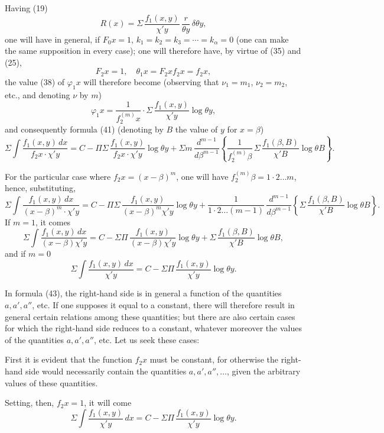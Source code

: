 \documentclass{article}
\begin{document}
Having (19)
\[ R(x) = \Sigma\,\frac{f_1(x, y)}{\chi' y}\,\frac{r}{\theta y}\,\delta\theta y, \]
one will have in general, if $F_0 x = 1$, $k_1 = k_2 = k_3 = \cdots = k_\alpha = 0$ (one can make the same supposition in every case); one will therefore have, by virtue of (35) and (25),
\[ F_2 x = 1, \quad \theta_1 x = F_2 x f_2 x = f_2 x, \]
the value (38) of $\varphi_1 x$ will therefore become (observing that $\nu_1 = m_1$, $\nu_2 = m_2$, etc., and denoting $\nu$ by $m$)
\[ \varphi_1 x = \frac{1}{f_2^{(m)} x} \cdot \Sigma\,\frac{f_1(x, y)}{\chi' y}\log\theta y, \]
and consequently formula (41) (denoting by $B$ the value of $y$ for $x = \beta$)
\[ \Sigma\int \frac{f_1(x, y)\,dx}{f_2 x \cdot \chi' y} = C - \Pi\Sigma\,\frac{f_1(x, y)}{f_2 x \cdot \chi' y}\log\theta y + \Sigma m\,\frac{d^{m-1}}{d\beta^{m-1}} \left\{ \frac{1}{f_2^{(m)}\beta}\,\Sigma\,\frac{f_1(\beta, B)}{\chi' B}\log\theta B \right\}. \tag{43} \]

For the particular case where $f_2 x = (x-\beta)^m$, one will have $f_2^{(m)}\beta = 1 \cdot 2 \ldots m$, hence, substituting,
\[ \Sigma\int \frac{f_1(x, y)\,dx}{(x-\beta)^m \cdot \chi' y} = C - \Pi\Sigma\,\frac{f_1(x, y)}{(x-\beta)^m \chi' y}\log\theta y + \frac{1}{1 \cdot 2 \ldots (m-1)}\,\frac{d^{m-1}}{d\beta^{m-1}} \left\{ \Sigma\,\frac{f_1(\beta, B)}{\chi' B}\log\theta B \right\}. \tag{44} \]
If $m = 1$, it comes
\[ \Sigma\int \frac{f_1(x, y)\,dx}{(x-\beta)\chi' y} = C - \Sigma\Pi\,\frac{f_1(x, y)}{(x-\beta)\chi' y}\log\theta y + \Sigma\,\frac{f_1(\beta, B)}{\chi' B}\log\theta B, \tag{45} \]
and if $m = 0$
\[ \Sigma\int \frac{f_1(x, y)\,dx}{\chi' y} = C - \Sigma\Pi\,\frac{f_1(x, y)}{\chi' y}\log\theta y. \tag{46} \]

In formula (43), the right-hand side is in general a function of the quantities $a, a', a''$, etc. If one supposes it equal to a constant, there will therefore result in general certain relations among these quantities; but there are also certain cases for which the right-hand side reduces to a constant, whatever moreover the values of the quantities $a, a', a''$, etc. Let us seek these cases:

First it is evident that the function $f_2 x$ must be constant, for otherwise the right-hand side would necessarily contain the quantities $a, a', a'', \ldots$, given the arbitrary values of these quantities.

Setting, then, $f_2 x = 1$, it will come
\[ \Sigma\int \frac{f_1(x, y)}{\chi' y}\,dx = C - \Sigma\Pi\,\frac{f_1(x, y)}{\chi' y}\log\theta y. \]
\end{document}
